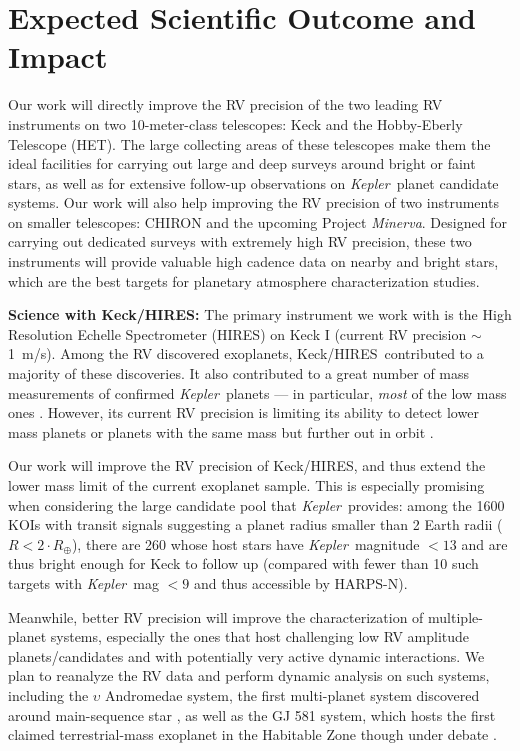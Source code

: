 \documentclass[12pt]{article}
\def\mps{m/s}
\def\kepler{{\it Kepler}}
\def\minerva{{\it Minerva}}
\def\keck{Keck/HIRES}
\begin{document}
\vspace{-3pt}
\section{Expected Scientific Outcome and Impact}

Our work will directly improve the RV precision of the two leading RV
instruments on two 10-meter-class telescopes: Keck and the
Hobby-Eberly Telescope (HET). The large collecting areas of these
telescopes make them the ideal facilities for carrying out large and
deep surveys around bright or faint stars, as well as for extensive
follow-up observations on \kepler\ planet candidate systems. Our work
will also help improving the RV precision of two
instruments on smaller telescopes: CHIRON and the upcoming Project
\minerva. Designed for carrying out dedicated surveys with extremely
high RV precision, these two instruments will provide valuable high
cadence data on nearby and bright stars, which are the best targets
for planetary atmosphere characterization studies.

\textbf{Science with \keck: } The primary instrument we work with is
the High Resolution Echelle Spectrometer (HIRES) on Keck I (current RV
precision $\sim$1~\mps). Among the RV discovered exoplanets,
\keck\ contributed to a majority of these discoveries. It also
contributed to a great number of mass measurements of confirmed
\kepler\ planets --- in particular, \textit{most} of the low mass ones
\citep[e.g.,][]{gautier2012,gilliland2013,howard2013,marcy2014}. However,
its current RV precision is limiting its ability to detect lower mass
planets or planets with the same mass but further out in orbit
\citep[e.g.,][]{marcy2014}.

Our work will improve the RV precision of \keck, and thus extend the
lower mass limit of the current exoplanet sample. This is especially
promising when considering the large candidate pool that
\kepler\ provides: among the 1600 KOIs with transit signals suggesting
a planet radius smaller than 2 Earth radii ($R<2\cdot R_{\oplus}$),
there are 260 whose host stars have \kepler\ magnitude $< 13$ and are
thus bright enough for Keck to follow up (compared with fewer than 10
such targets with \kepler\ mag $< 9$ and thus accessible by HARPS-N).

Meanwhile, better RV precision will improve the characterization of
multiple-planet systems, especially the ones that host challenging low
RV amplitude planets/candidates and with potentially very active
dynamic interactions. We plan to reanalyze the RV data and perform
dynamic analysis on such systems, including the $\upsilon$ Andromedae
system, the first multi-planet system discovered around main-sequence
star \citep{butler1999,wright2009,curiel2011}, as well as the GJ 581
system, which hosts the first claimed terrestrial-mass exoplanet in
the Habitable Zone \citep{vogt2010} though under debate
\citep[e.g.,][]{gregory2011,vogt2012,robertson2013}. 
\end{document}

